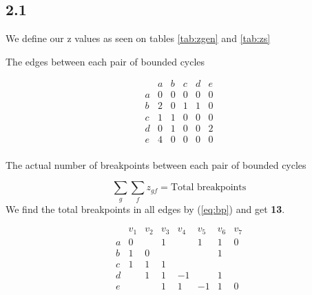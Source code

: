\subsection*{2.1}
We define our z values as seen on tables \ref{tab:zgen} and \ref{tab:zs}
\begin{table}[ht!]
    \caption{The edges between each pair of bounded cycles}
    \label{tab:zgen}
\end{table}
\begin{table}[ht!]
    \[ \begin{array}{l||c|c|c|c|c}
          & a & b & c & d & e \\\hline\hline
        a & 0 & 0 & 0 & 0 & 0 \\
        b & 2 & 0 & 1 & 1 & 0 \\
        c & 1 & 1 & 0 & 0 & 0 \\
        d & 0 & 1 & 0 & 0 & 2 \\
        e & 4 & 0 & 0 & 0 & 0 \\
    \end{array} 
    \]
    \caption{The actual number of breakpoints between each pair of bounded cycles}
    \label{tab:zs}
\end{table}
\begin{equation}\label{eq:bp}
    \sum\limits_{g}\sum\limits_{f} z_{gf} = \text{Total breakpoints}
\end{equation}
We find the total breakpoints in all edges by (\ref{eq:bp}) and get \textbf{13}.
\begin{table}[!ht]
    \[ \begin{array}{l||c|c|c|c|c|c|c}
          & v_1 & v_2 & v_3 & v_4 & v_5 & v_6 & v_7 \\\hline\hline
        a & 0   &     & 1   &     & 1   & 1   & 0   \\
        b & 1   & 0   &     &     &     & 1   &     \\
        c & 1   & 1   & 1   &     &     &     &     \\
        d &     & 1   & 1   & -1  &     & 1   &     \\
        e &     &     & 1   & 1   & -1  & 1   & 0   \\
    \end{array} \]
\end{table}
